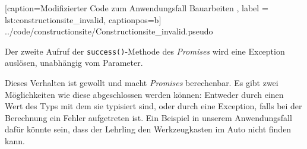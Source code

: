 
    [caption={Modifizierter Code zum Anwendungsfall \glqq Bauarbeiten\grqq{} },
       label = lst:constructionsite_invalid,
       captionpos=b]
 {../code/constructionsite/Constructionsite_invalid.pseudo}
 
Der zweite Aufruf der \texttt{success()}-Methode des \emph{Promises}
wird eine Exception auslösen, unabhängig vom Parameter.

Dieses Verhalten ist gewollt und macht \emph{Promises} berechenbar.
Es gibt zwei Möglichkeiten wie diese abgeschlossen werden können:
Entweder durch einen Wert des Typs mit dem sie typisiert sind,
oder durch eine Exception, falls bei der Berechnung ein Fehler aufgetreten ist.
Ein Beispiel in unserem Anwendungsfall dafür könnte sein, dass der
Lehrling den Werkzeugkasten im Auto nicht finden kann.
